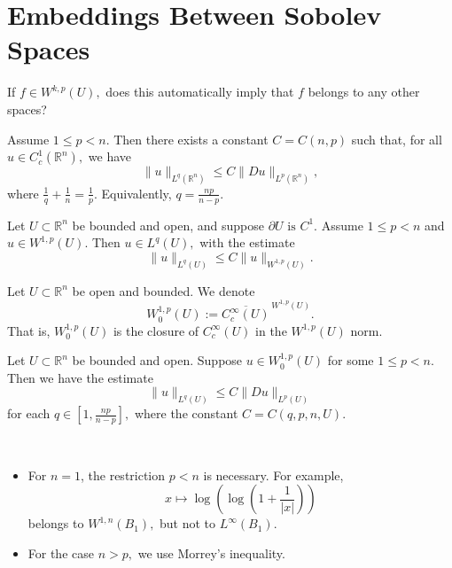 \section{Embeddings Between Sobolev Spaces}
If
$
f\in W^{k,p}(U),
$
does this automatically imply that $f$ belongs to any other spaces?

\begin{theorem}
Assume
$
1\le p<n.
$
Then there exists a constant
$
C=C(n,p)
$
such that, for all
$
u\in C_c^1(\mathbb{R}^n),
$
we have
$$
\|u\|_{L^q(\mathbb{R}^n)}
\le
C\|Du\|_{L^p(\mathbb{R}^n)},
$$
where
$
\frac{1}{q}+\frac{1}{n}=\frac{1}{p}.
$
Equivalently,
$
q=\frac{np}{n-p}.
$
\end{theorem}

\begin{corollary}
Let
$
U\subset \mathbb{R}^n
$
be bounded and open, and suppose
$
\partial U \text{ is } C^1.
$
Assume
$
1\le p<n
$
and
$
u\in W^{1,p}(U).
$
Then
$
u\in L^q(U),
$
with the estimate
$$
\|u\|_{L^q(U)}
\le
C\|u\|_{W^{1,p}(U)}.
$$
\end{corollary}

\begin{definition}
Let
$
U\subset \mathbb{R}^n
$
be open and bounded. We denote
$$
W_0^{1,p}(U)
:=
\overline{C_c^\infty(U)}^{\,W^{1,p}(U)}.
$$
That is, $W_0^{1,p}(U)$ is the closure of $C_c^\infty(U)$ in the $W^{1,p}(U)$ norm.
\end{definition}

\begin{corollary}
Let
$
U\subset \mathbb{R}^n
$
be bounded and open. Suppose
$
u\in W_0^{1,p}(U)
$
for some
$
1\le p<n.
$
Then we have the estimate
$$
\|u\|_{L^q(U)}
\le
C\|Du\|_{L^p(U)}
$$
for each
$
q\in \left[1,\frac{np}{n-p}\right],
$
where the constant
$
C=C(q,p,n,U).
$
\end{corollary}

\begin{remark}\
    \begin{itemize}
        \item For $n=1$, the restriction $p<n$ is necessary.
        For example,
        $$
        x\mapsto \log\!\left(\log\!\left(1+\frac{1}{|x|}\right)\right)
        $$
        belongs to
        $
        W^{1,n}(B_1),
        $
        but not to
        $
        L^\infty(B_1).
        $

        \item For the case
        $
        n>p,
        $
        we use Morrey's inequality.
    \end{itemize}
\end{remark}